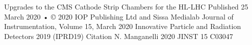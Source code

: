 Upgrades to the CMS Cathode Strip Chambers for the HL-LHC
Published 25 March 2020 • © 2020 IOP Publishing Ltd and Sissa Medialab
Journal of Instrumentation, Volume 15, March 2020
Innovative Particle and Radiation Detectors 2019 (IPRD19)
Citation N. Manganelli 2020 JINST 15 C03047